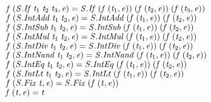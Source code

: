 \documentclass[10pt]{article}
\newcommand{\Conid}[1]{\mathit{#1}}
\newcommand{\Varid}[1]{\mathit{#1}}
\begin{document}
\begin{hscode}
${\hskip1.00em\relax\hskip1.00em\relax\Varid{f}\;(\Conid{\Conid{S}.If}\;\Varid{t}_{1}\;\Varid{t}_{2}\;\Varid{t}_{3},\Varid{e})\mathrel{=}\Conid{\Conid{S}.If}\;(\Varid{f}\;(\Varid{t}_{1},\Varid{e}))\;(\Varid{f}\;(\Varid{t}_{2},\Varid{e}))\;(\Varid{f}\;(\Varid{t}_{3},\Varid{e}))}$\\
${\hskip1.00em\relax\hskip1.00em\relax\Varid{f}\;(\Conid{\Conid{S}.IntAdd}\;\Varid{t}_{1}\;\Varid{t}_{2},\Varid{e})\mathrel{=}\Conid{\Conid{S}.IntAdd}\;(\Varid{f}\;(\Varid{t}_{1},\Varid{e}))\;(\Varid{f}\;(\Varid{t}_{2},\Varid{e}))}$\\
${\hskip1.00em\relax\hskip1.00em\relax\Varid{f}\;(\Conid{\Conid{S}.IntSub}\;\Varid{t}_{1}\;\Varid{t}_{2},\Varid{e})\mathrel{=}\Conid{\Conid{S}.IntSub}\;(\Varid{f}\;(\Varid{t}_{1},\Varid{e}))\;(\Varid{f}\;(\Varid{t}_{2},\Varid{e}))}$\\
${\hskip1.00em\relax\hskip1.00em\relax\Varid{f}\;(\Conid{\Conid{S}.IntMul}\;\Varid{t}_{1}\;\Varid{t}_{2},\Varid{e})\mathrel{=}\Conid{\Conid{S}.IntMul}\;(\Varid{f}\;(\Varid{t}_{1},\Varid{e}))\;(\Varid{f}\;(\Varid{t}_{2},\Varid{e}))}$\\
${\hskip1.00em\relax\hskip1.00em\relax\Varid{f}\;(\Conid{\Conid{S}.IntDiv}\;\Varid{t}_{1}\;\Varid{t}_{2},\Varid{e})\mathrel{=}\Conid{\Conid{S}.IntDiv}\;(\Varid{f}\;(\Varid{t}_{1},\Varid{e}))\;(\Varid{f}\;(\Varid{t}_{2},\Varid{e}))}$\\
${\hskip1.00em\relax\hskip1.00em\relax\Varid{f}\;(\Conid{\Conid{S}.IntNand}\;\Varid{t}_{1}\;\Varid{t}_{2},\Varid{e})\mathrel{=}\Conid{\Conid{S}.IntNand}\;(\Varid{f}\;(\Varid{t}_{1},\Varid{e}))\;(\Varid{f}\;(\Varid{t}_{2},\Varid{e}))}$\\
${\hskip1.00em\relax\hskip1.00em\relax\Varid{f}\;(\Conid{\Conid{S}.IntEq}\;\Varid{t}_{1}\;\Varid{t}_{2},\Varid{e})\mathrel{=}\Conid{\Conid{S}.IntEq}\;(\Varid{f}\;(\Varid{t}_{1},\Varid{e}))\;(\Varid{f}\;(\Varid{t}_{2},\Varid{e}))}$\\
${\hskip1.00em\relax\hskip1.00em\relax\Varid{f}\;(\Conid{\Conid{S}.IntLt}\;\Varid{t}_{1}\;\Varid{t}_{2},\Varid{e})\mathrel{=}\Conid{\Conid{S}.IntLt}\;(\Varid{f}\;(\Varid{t}_{1},\Varid{e}))\;(\Varid{f}\;(\Varid{t}_{2},\Varid{e}))}$\\
${\hskip1.00em\relax\hskip1.00em\relax\Varid{f}\;(\Conid{\Conid{S}.Fix}\;\Varid{t},\Varid{e})\mathrel{=}\Conid{\Conid{S}.Fix}\;(\Varid{f}\;(\Varid{t},\Varid{e}))}$\\
${\hskip1.00em\relax\hskip1.00em\relax\Varid{f}\;(\Varid{t},\Varid{e})\mathrel{=}\Varid{t}}$\ColumnHook
\end{hscode}\resethooks
\end{document}
